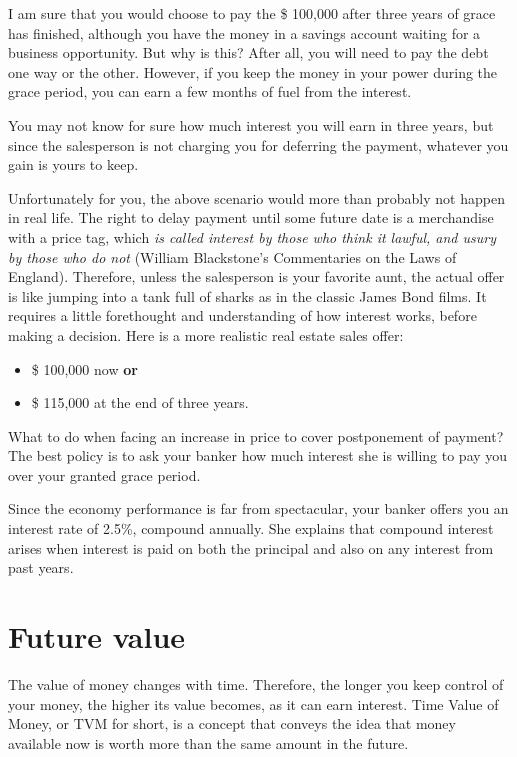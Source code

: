 \documentclass[a4paper,12pt]{book}
\begin{document}
I am sure that you would choose to pay the \$ 100,000 after
three years of grace has finished, although you have the
money in a savings account waiting for a business
opportunity. But why is this? After all, you will need
to pay the debt one way or the other. However, if you
keep the money in your power during the grace period,
you can earn a few months of fuel from the interest.

You may not know for sure how much interest you
will earn in three years, but since the salesperson
is not charging you for deferring the payment,
whatever you gain is yours to keep.

Unfortunately for you, the above scenario would
more than probably not happen in real life.
The right to delay payment until some future
date is a merchandise with a price tag,
which {\em is called interest by those who
think it lawful, and usury by those who
do not} (William Blackstone's Commentaries
on the Laws of England). Therefore, unless
the salesperson is your favorite aunt,
the actual offer is like jumping into a tank
full of sharks as in the classic James Bond films.
It requires a little forethought and understanding
of how interest works, before making a decision.
Here is a more realistic real estate sales offer:

\begin{itemize}
\item \$ 100,000 now {\bf or}
\item \$ 115,000 at the end of three years.
\end{itemize}

What to do when facing an increase in price
to cover postponement of payment? The best
policy is to ask your banker how much interest
she is willing to pay you over your
granted grace period.

Since the economy performance is far
from spectacular, your banker offers you
an interest rate of 2.5\%, compound annually.
She explains that compound interest arises
when interest is paid on both the principal
and also on any interest from past years.

\section{Future value}


The value of money changes with time. Therefore,
the longer you keep control of your money,
the higher its value becomes, as it can earn
interest. Time Value of Money, or TVM for short,
is a concept that conveys the idea that money
available now is worth more than the same
amount in the future.
\end{document}
